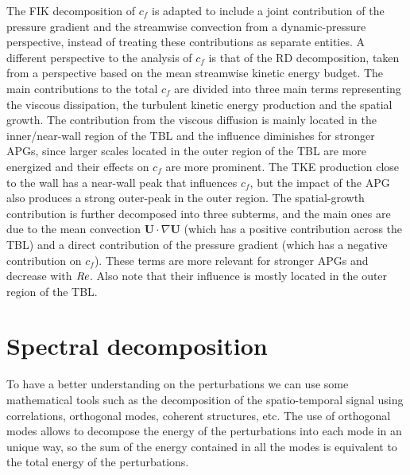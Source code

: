 The FIK decomposition of $c_f$ is adapted to include a joint contribution of the pressure gradient and the streamwise convection from a dynamic-pressure perspective, instead of treating these contributions as separate entities.
A different perspective to the analysis of $c_f$ is that of the RD decomposition, taken from a perspective based on the mean streamwise kinetic energy budget. 
The main contributions to the total $c_f$ are divided into three main terms representing the viscous dissipation, the turbulent kinetic energy production and the spatial growth.
The contribution from the viscous diffusion is mainly located in the inner/near-wall region of the TBL and the influence diminishes for stronger APGs, since larger scales located in the outer region of the TBL are more energized and their effects on $c_f$ are more prominent.
The TKE production close to the wall has a near-wall peak that influences $c_f$, but the impact of the APG also produces a strong outer-peak in the outer region.
The spatial-growth contribution is further decomposed into three subterms, and the main ones are due to the mean convection $\mathbf{U}\cdot \nabla\mathbf{U}$ (which has a positive contribution across the TBL) and a direct contribution of the pressure gradient (which has a negative contribution on $c_f$). These terms are more relevant for stronger APGs and decrease with $\mbox{\textit{Re}}$. Also note that their influence is mostly located in the outer region of the TBL.


\section{Spectral decomposition}
To have a better understanding on the perturbations we can use some mathematical tools such as the decomposition of the spatio-temporal signal using correlations, orthogonal modes, coherent structures, etc.
The use of orthogonal modes allows to decompose the energy of the perturbations into each mode in an unique way, so the sum of the energy contained in all the modes is equivalent to the total energy of the perturbations. 

